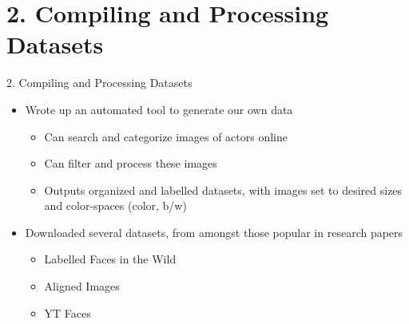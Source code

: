 \documentclass{beamer}
\begin{document}
\section{2. Compiling and Processing Datasets} 
\begin{frame}{2. Compiling and Processing Datasets}
\begin{itemize}
    \item Wrote up an automated tool to generate our own data
    \begin{itemize}
        \item Can search and categorize images of actors online
        \item Can filter and process these images
        \item Outputs organized and labelled datasets, with images set to desired sizes and color-spaces (color, b/w)
    \end{itemize}
    \item Downloaded several datasets, from amongst those popular in research papers
    \begin{itemize}
        \item Labelled Faces in the Wild \cite{lfwild_site}
        \item Aligned Images \cite{alignedfaces_site}
        \item YT Faces \cite{ytfaces_site}
    \end{itemize}
\end{itemize}
\end{frame}
\end{document}
